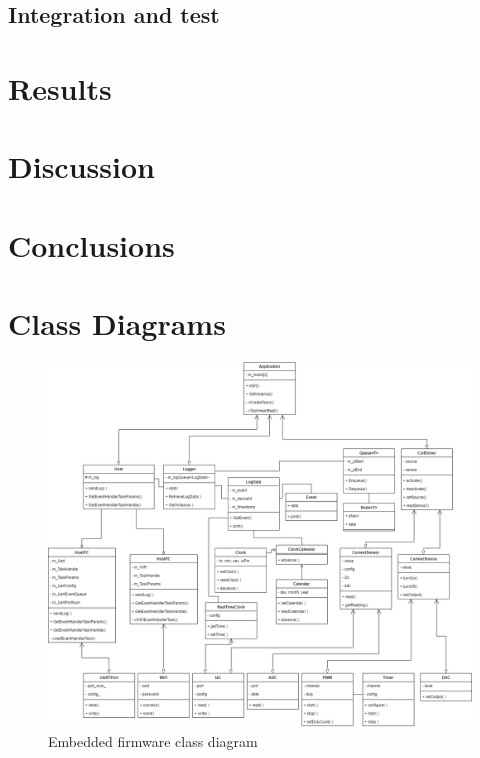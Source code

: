 \documentclass[10pt,twocolumn,letterpaper]{article}
\begin{document}
\subsection{Integration and test}


\section{Results}


\section{Discussion}


\section*{Conclusions}

\fi



\onecolumn

\appendix
\appendixpage

\section{Class Diagrams} \label{app:class-diagrams}

\begin{figure}[htb]
  \centering
  \includegraphics[width=\linewidth, keepaspectratio]{figures/emb-class-diagram.png}
  \caption{Embedded firmware class diagram}
  \label{fig:emb-class-diagram}
\end{figure}
\end{document}
